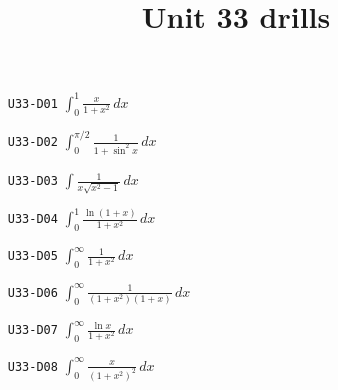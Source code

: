 \title{Unit 33 drills}\maketitle\begin{enumerate}
  \item[\texttt{U33-D01}] $\displaystyle \int_{0}^{1}\frac{x}{1+x^{2}}\,dx$
  \item[\texttt{U33-D02}] $\displaystyle \int_{0}^{\pi/2}\frac{1}{1+\sin^{2}x}\,dx$
  \item[\texttt{U33-D03}] $\displaystyle \int\frac{1}{x\sqrt{x^{2}-1}}\,dx$
  \item[\texttt{U33-D04}] $\displaystyle \int_{0}^{1}\frac{\ln(1+x)}{1+x^{2}}\,dx$
  \item[\texttt{U33-D05}] $\displaystyle \int_{0}^{\infty}\frac{1}{1+x^{2}}\,dx$
  \item[\texttt{U33-D06}] $\displaystyle \int_{0}^{\infty}\frac{1}{(1+x^{2})(1+x)}\,dx$
  \item[\texttt{U33-D07}] $\displaystyle \int_{0}^{\infty}\frac{\ln x}{1+x^{2}}\,dx$
  \item[\texttt{U33-D08}] $\displaystyle \int_{0}^{\infty}\frac{x}{(1+x^{2})^{2}}\,dx$
\end{enumerate}
